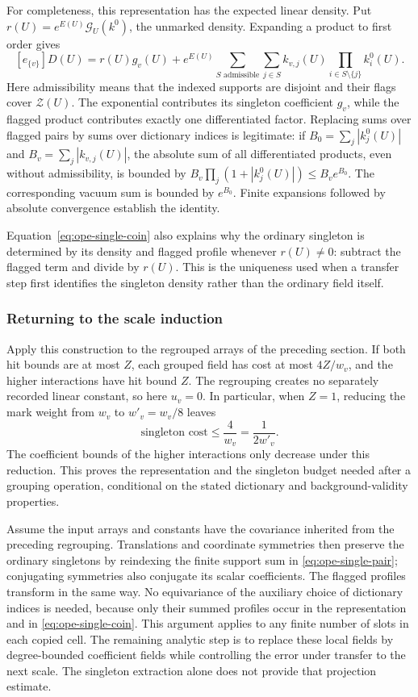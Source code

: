 For completeness, this representation has the expected linear
density. Put $r(U)=e^{E(U)}\mathcal G_U(k^0)$, the unmarked density.
Expanding a product to first order gives
\begin{equation}\label{eq:ope-single-coin}
 [e_{\{v\}}]D(U)=r(U)g_v(U)
 +e^{E(U)}\sum_{S\text{ admissible}}
          \sum_{j\in S}k_{v,j}(U)
                         \prod_{i\in S\setminus\{j\}}k_i^0(U).
\end{equation}
Here admissibility means that the indexed supports are disjoint
and their flags cover $\mathcal Z(U)$. The exponential contributes
its singleton coefficient $g_v$, while the flagged product contributes
exactly one differentiated factor. Replacing sums over flagged pairs
by sums over dictionary indices is legitimate: if
$B_0=\sum_j|k_j^0(U)|$ and $B_v=\sum_j|k_{v,j}(U)|$, the absolute
sum of all differentiated products, even without admissibility,
is bounded by $B_v\prod_j(1+|k_j^0(U)|)\le B_ve^{B_0}$.
The corresponding vacuum sum is bounded by $e^{B_0}$. Finite
expansions followed by absolute convergence establish the identity.

Equation~\eqref{eq:ope-single-coin} also explains why the ordinary
singleton is determined by its density and flagged profile whenever
$r(U)\ne0$: subtract the flagged term and divide by $r(U)$.
This is the uniqueness used when a transfer step first identifies
the singleton density rather than the ordinary field itself.

\subsubsection{Returning to the scale induction}
Apply this construction to the regrouped arrays of the preceding
section. If both hit bounds are at most $Z$, each grouped field has
cost at most $4Z/w_v$, and the higher interactions have hit bound
$Z$. The regrouping creates no separately recorded linear constant,
so here $u_v=0$. In particular, when $Z=1$, reducing the mark weight
from $w_v$ to $w'_v=w_v/8$ leaves
\[
             \text{singleton cost}\le\frac4{w_v}
                                  =\frac1{2w'_v}.
\]
The coefficient bounds of the higher interactions only decrease
under this reduction. This proves the representation and the
singleton budget needed after a grouping operation, conditional on
the stated dictionary and background-validity properties.

Assume the input arrays and constants have the covariance inherited
from the preceding regrouping. Translations and coordinate symmetries
then preserve the ordinary
singletons by reindexing the finite support sum in
\eqref{eq:ope-single-pair}; conjugating symmetries also conjugate
its scalar coefficients. The flagged profiles transform in the
same way. No equivariance of the auxiliary choice of dictionary
indices is needed, because only their summed profiles occur in
the representation and in \eqref{eq:ope-single-coin}. This argument
applies to any finite number of slots in each copied cell.
The remaining analytic step is to replace these local fields by
degree-bounded coefficient fields while controlling the error
under transfer to the next scale. The singleton extraction alone
does not provide that projection estimate.
